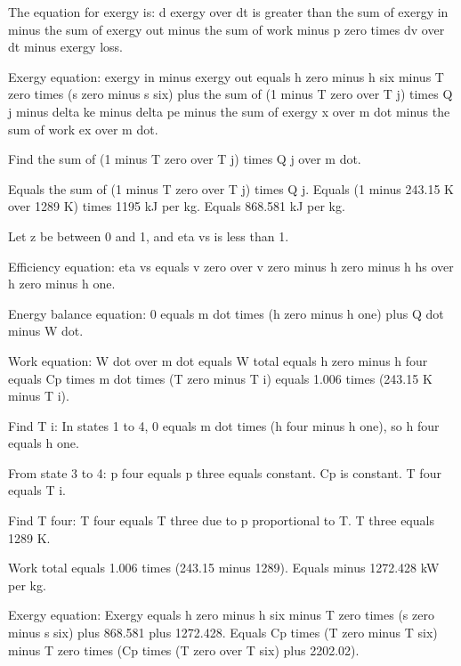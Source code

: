 The equation for exergy is:  
d exergy over dt is greater than the sum of exergy in minus the sum of exergy out minus the sum of work minus p zero times dv over dt minus exergy loss.  

Exergy equation:  
exergy in minus exergy out equals h zero minus h six minus T zero times (s zero minus s six) plus the sum of (1 minus T zero over T j) times Q j minus delta ke minus delta pe minus the sum of exergy x over m dot minus the sum of work ex over m dot.  

Find the sum of (1 minus T zero over T j) times Q j over m dot.  

Equals the sum of (1 minus T zero over T j) times Q j.  
Equals (1 minus 243.15 K over 1289 K) times 1195 kJ per kg.  
Equals 868.581 kJ per kg.  

Let z be between 0 and 1, and eta vs is less than 1.  

Efficiency equation:  
eta vs equals v zero over v zero minus h zero minus h hs over h zero minus h one.  

Energy balance equation:  
0 equals m dot times (h zero minus h one) plus Q dot minus W dot.  

Work equation:  
W dot over m dot equals W total equals h zero minus h four equals Cp times m dot times (T zero minus T i) equals 1.006 times (243.15 K minus T i).  

Find T i:  
In states 1 to 4, 0 equals m dot times (h four minus h one), so h four equals h one.  

From state 3 to 4:  
p four equals p three equals constant. Cp is constant. T four equals T i.  

Find T four:  
T four equals T three due to p proportional to T.  
T three equals 1289 K.  

Work total equals 1.006 times (243.15 minus 1289).  
Equals minus 1272.428 kW per kg.  

Exergy equation:  
Exergy equals h zero minus h six minus T zero times (s zero minus s six) plus 868.581 plus 1272.428.  
Equals Cp times (T zero minus T six) minus T zero times (Cp times (T zero over T six) plus 2202.02).